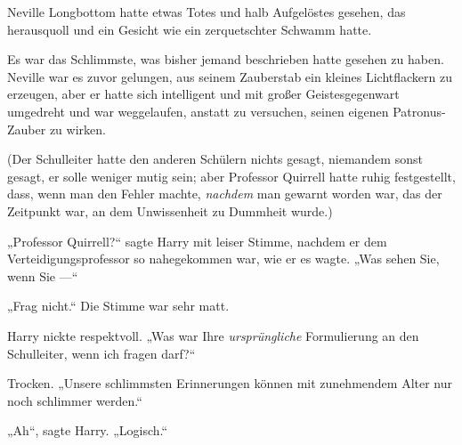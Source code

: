 \later

Neville Longbottom hatte etwas Totes und halb Aufgelöstes gesehen, das herausquoll und ein Gesicht wie ein zerquetschter Schwamm hatte.

Es war das Schlimmste, was bisher jemand beschrieben hatte gesehen zu haben. Neville war es zuvor gelungen, aus seinem Zauberstab ein kleines Lichtflackern zu erzeugen, aber er hatte sich intelligent und mit großer Geistesgegenwart umgedreht und war weggelaufen, anstatt zu versuchen, seinen eigenen Patronus-Zauber zu wirken.

(Der Schulleiter hatte den anderen Schülern nichts gesagt, niemandem sonst gesagt, er solle weniger mutig sein; aber Professor Quirrell hatte ruhig festgestellt, dass, wenn man den Fehler machte, \emph{nachdem} man gewarnt worden war, das der Zeitpunkt war, an dem Unwissenheit zu Dummheit wurde.)

„Professor Quirrell?“ sagte Harry mit leiser Stimme, nachdem er dem Verteidigungsprofessor so nahegekommen war, wie er es wagte.
„Was sehen Sie, wenn Sie —“

„Frag nicht.“ Die Stimme war sehr matt.

Harry nickte respektvoll.
„Was war Ihre \emph{ursprüngliche} Formulierung an den Schulleiter, wenn ich fragen darf?“

Trocken.
„Unsere schlimmsten Erinnerungen können mit zunehmendem Alter nur noch schlimmer werden.“

„Ah“, sagte Harry.
„Logisch.“

